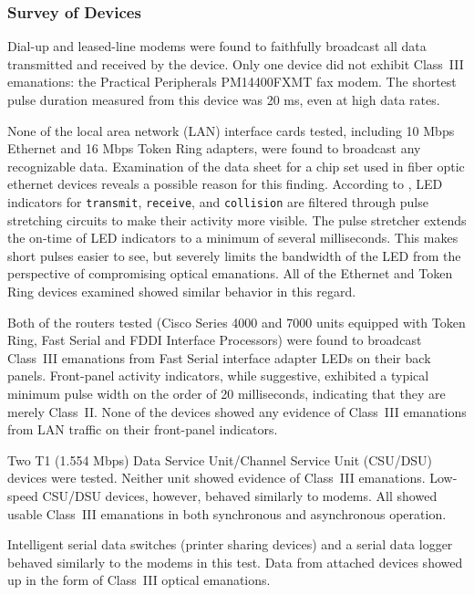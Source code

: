 \documentclass[twocolumn]{article}
\begin{document}
\subsubsection{Survey of Devices}

Dial-up and leased-line modems were found to faithfully broadcast all data transmitted and received by the device.  Only one device did not exhibit Class~III emanations: the Practical Peripherals PM14400FXMT fax modem.  The shortest pulse duration measured from this device was 20 ms, even at high data rates.

None of the local area network (LAN) interface cards tested, including 10 Mbps Ethernet and 16 Mbps Token Ring adapters, were found to broadcast any recognizable data.  Examination of the data sheet for a chip set used in fiber optic ethernet devices reveals a possible reason for this finding.  According to \cite{hp_led_data_sheet}, LED indicators for {\tt transmit}, {\tt receive}, and {\tt collision} are filtered through pulse stretching circuits to make their activity more visible.  The pulse stretcher extends the on-time of LED indicators to a minimum of several milliseconds.  This makes short pulses easier to see, but severely limits the bandwidth of the LED from the perspective of compromising optical emanations.  All of the Ethernet and Token Ring devices examined showed similar behavior in this regard.

Both of the routers tested (Cisco Series 4000 and 7000 units equipped with Token Ring, Fast Serial and FDDI Interface Processors) were found to broadcast Class~III emanations from Fast Serial interface adapter LEDs on their back panels.  Front-panel activity indicators, while suggestive, exhibited a typical minimum pulse width on the order of 20 milliseconds, indicating that they are merely Class~II.  None of the devices showed any evidence of Class~III emanations from LAN traffic on their front-panel indicators.

Two T1 (1.554 Mbps) Data Service Unit/Channel Service Unit (CSU/DSU) devices were tested.  Neither unit showed evidence of Class~III emanations.  Low-speed CSU/DSU devices, however, behaved similarly to modems.  All showed usable Class~III emanations in both synchronous and asynchronous operation.

Intelligent serial data switches (printer sharing devices) and a serial data logger behaved similarly to the modems in this test.  Data from attached devices showed up in the form of Class~III optical emanations.
\end{document}
